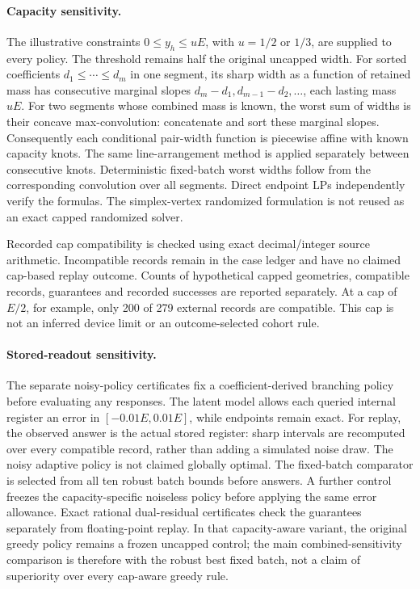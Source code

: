 \paragraph{Capacity sensitivity.}
The illustrative constraints $0\leq y_h\leq uE$, with $u=1/2$ or $1/3$,
are supplied to every policy. The threshold remains half the original
uncapped width. For sorted coefficients $d_1\leq\cdots\leq d_m$ in one
segment, its sharp width as a function of retained mass has consecutive
marginal slopes $d_m-d_1,d_{m-1}-d_2,\ldots$, each lasting mass $uE$.
For two segments whose combined mass is known, the worst sum of widths is
their concave max-convolution: concatenate and sort these marginal slopes.
Consequently each conditional pair-width function is piecewise affine with
known capacity knots. The same line-arrangement method is applied separately
between consecutive knots. Deterministic fixed-batch worst widths follow
from the corresponding convolution over all segments. Direct endpoint LPs
independently verify the formulas. The simplex-vertex randomized formulation
is not reused as an exact capped randomized solver.

Recorded cap compatibility is checked using exact decimal/integer source
arithmetic. Incompatible records remain in the case ledger and have no
claimed cap-based replay outcome. Counts of hypothetical capped geometries,
compatible records, guarantees and recorded successes are reported separately.
At a cap of $E/2$, for example, only 200 of 279 external records are compatible.
This cap is not an inferred device limit or an outcome-selected cohort rule.

\paragraph{Stored-readout sensitivity.}
The separate noisy-policy certificates fix a coefficient-derived branching
policy before evaluating any responses. The latent model allows each queried
internal register an error in $[-0.01E,0.01E]$, while endpoints remain exact.
For replay, the observed answer is the actual stored register: sharp intervals
are recomputed over every compatible record, rather than adding a simulated
noise draw. The noisy adaptive policy is not claimed globally optimal.
The fixed-batch comparator is selected from all ten robust batch bounds before
answers. A further control freezes the capacity-specific noiseless policy
before applying the same error allowance. Exact rational dual-residual
certificates check the guarantees separately from floating-point replay.
In that capacity-aware variant, the original greedy policy remains a frozen
uncapped control; the main combined-sensitivity comparison is therefore with
the robust best fixed batch, not a claim of superiority over every cap-aware
greedy rule.

